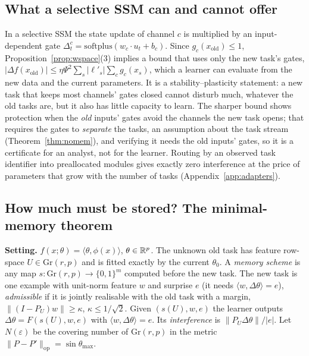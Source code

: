 \subsection{What a selective SSM can and cannot offer}
In a selective SSM the state update of channel $c$ is multiplied by an input-dependent gate $\Delta_t^c=\mathrm{softplus}(w_c\cdot u_t+b_c)$. Since $g_c(x_{\mathrm{old}})\le1$, Proposition~\ref{prop:wspace}(3) implies a bound that uses only the new task's gates, $|\Delta f(x_{\mathrm{old}})|\le\eta\Psi^2\sum_s|\ell'_s|\sum_cg_c(x_s)$, which a learner can evaluate from the new data and the current parameters. It is a stability--plasticity statement: a new task that keeps most channels' gates closed cannot disturb much, whatever the old tasks are, but it also has little capacity to learn. The sharper bound shows protection when the \emph{old} inputs' gates avoid the channels the new task opens; that requires the gates to \emph{separate} the tasks, an assumption about the task stream (Theorem~\ref{thm:nomem}), and verifying it needs the old inputs' gates, so it is a certificate for an analyst, not for the learner. Routing by an observed task identifier into preallocated modules gives exactly zero interference at the price of parameters that grow with the number of tasks (Appendix~\ref{app:adapters}).

\subsection{How much must be stored? The minimal-memory theorem}
\textbf{Setting.} $f(x;\theta)=\langle\theta,\phi(x)\rangle$, $\theta\in\mathbb{R}^p$. The unknown old task has feature row-space $U\in\mathrm{Gr}(r,p)$ and is fitted exactly by the current $\theta_0$. A \emph{memory scheme} is any map $s:\mathrm{Gr}(r,p)\to\{0,1\}^m$ computed before the new task. The new task is one example with unit-norm feature $w$ and surprise $e$ (it needs $\langle w,\Delta\theta\rangle=e$), \emph{admissible} if it is jointly realisable with the old task with a margin, $\|(I-P_U)w\|\ge\kappa$, $\kappa\le1/\sqrt2$. Given $(s(U),w,e)$ the learner outputs $\Delta\theta=F(s(U),w,e)$ with $\langle w,\Delta\theta\rangle=e$. Its \emph{interference} is $\|P_U\Delta\theta\|/|e|$. Let $N(\varepsilon)$ be the covering number of $\mathrm{Gr}(r,p)$ in the metric $\|P-P'\|_{\mathrm{op}}=\sin\theta_{\max}$.


